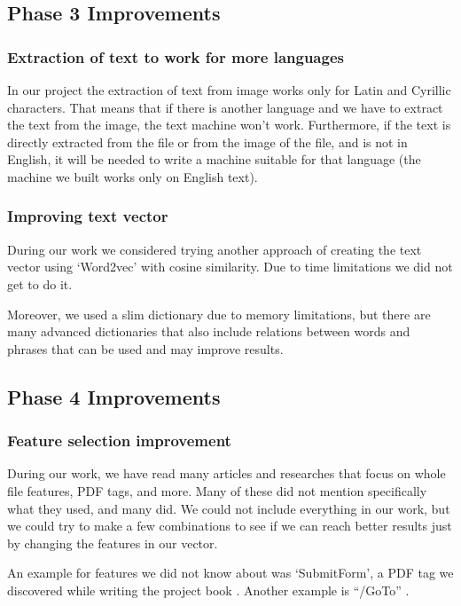 \documentclass{article}
\begin{document}
\subsection{Phase 3 Improvements }
\subsubsection{Extraction of text to work for more languages}
\indent In our project the extraction of text from image works only for Latin and Cyrillic characters. That means that if there is another language and we have to extract the text from the image, the text machine won't work. Furthermore, if the text is directly extracted from the file or from the image of the file, and is not in English, it will be needed to write a machine suitable for that language (the machine we built works only on English text).

\subsubsection{Improving text vector}
\indent During our work we considered trying another approach of creating the text vector using ‘Word2vec’ with cosine similarity. Due to time limitations we did not get to do it.

\indent Moreover, we used a slim dictionary due to memory limitations, but there are many advanced dictionaries that also include relations between words and phrases that can be used and may improve results.

\subsection{Phase 4 Improvements} 
\subsubsection{Feature selection improvement}
\indent During our work, we have read many articles and researches that focus on whole file features, PDF tags, and more. Many of these did not mention specifically what they used, and many did. We could not include everything in our work, but we could try to make a few combinations to see if we can reach better results just by changing the features in our vector. 

\indent An example for features we did not know about was ‘SubmitForm’, a PDF tag we discovered while writing the project book \cite{Hamon2013malicious}. Another example is “/GoTo” \cite{BGU2014malicious}.
\end{document}
